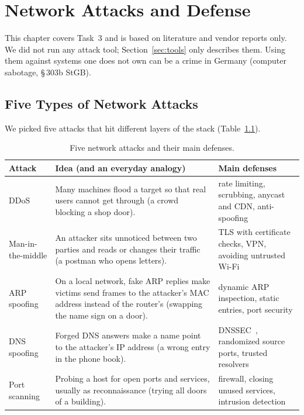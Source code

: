 \chapter{Network Attacks and Defense}\label{chap:attacks}

This chapter covers Task~3 and is based on literature and vendor reports only. We did not run any attack tool; Section~\ref{sec:tools} only describes them. Using them against systems one does not own can be a crime in Germany (computer sabotage, \S\,303b StGB).

\section{Five Types of Network Attacks}\label{sec:fiveattacks}

We picked five attacks that hit different layers of the stack (Table~\ref{tab:fiveattacks}).

\begin{table}[ht]
	\centering
	\small
	\begin{tabularx}{\textwidth}{@{}l>{\raggedright\arraybackslash}X>{\raggedright\arraybackslash}X@{}}
		\toprule
		Attack & Idea (and an everyday analogy) & Main defenses \\
		\midrule
		DDoS & Many machines flood a target so that real users cannot get through (a crowd blocking a shop door). & rate limiting, scrubbing, anycast and CDN, anti-spoofing \\
		Man-in-the-middle & An attacker sits unnoticed between two parties and reads or changes their traffic (a postman who opens letters). & TLS with certificate checks, VPN, avoiding untrusted Wi-Fi \\
		ARP spoofing & On a local network, fake ARP replies make victims send frames to the attacker's MAC address instead of the router's (swapping the name sign on a door). & dynamic ARP inspection, static entries, port security \\
		DNS spoofing & Forged DNS answers make a name point to the attacker's IP address (a wrong entry in the phone book). & DNSSEC~\cite{rfc4033}, randomized source ports, trusted resolvers \\
		Port scanning & Probing a host for open ports and services, usually as reconnaissance (trying all doors of a building). & firewall, closing unused services, intrusion detection \\
		\bottomrule
	\end{tabularx}
	\caption{Five network attacks and their main defenses.}
	\label{tab:fiveattacks}
\end{table}

